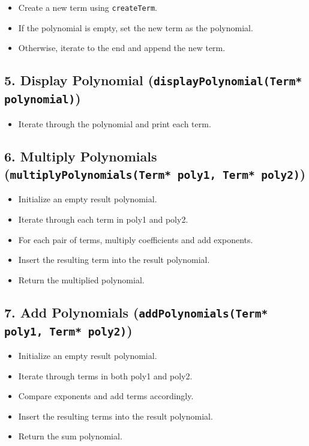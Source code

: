 \documentclass{article}
\begin{document}
\begin{itemize}
  \item Create a new term using \texttt{createTerm}.
  \item If the polynomial is empty, set the new term as the polynomial.
  \item Otherwise, iterate to the end and append the new term.
\end{itemize}

\subsection*{5. Display Polynomial (\texttt{displayPolynomial(Term* polynomial)})}

\begin{itemize}
  \item Iterate through the polynomial and print each term.
\end{itemize}

\subsection*{6. Multiply Polynomials (\texttt{multiplyPolynomials(Term* poly1, Term* poly2)})}

\begin{itemize}
  \item Initialize an empty result polynomial.
  \item Iterate through each term in poly1 and poly2.
  \item For each pair of terms, multiply coefficients and add exponents.
  \item Insert the resulting term into the result polynomial.
  \item Return the multiplied polynomial.
\end{itemize}

\subsection*{7. Add Polynomials (\texttt{addPolynomials(Term* poly1, Term* poly2)})}

\begin{itemize}
  \item Initialize an empty result polynomial.
  \item Iterate through terms in both poly1 and poly2.
  \item Compare exponents and add terms accordingly.
  \item Insert the resulting terms into the result polynomial.
  \item Return the sum polynomial.
\end{itemize}
\end{document}
